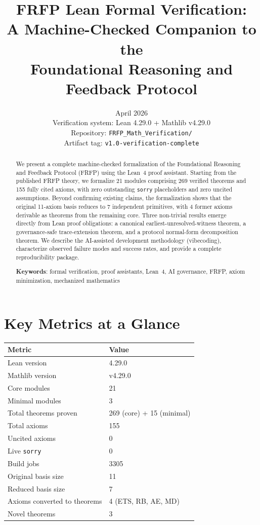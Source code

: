 \documentclass[12pt,a4paper]{article}
\title{%
  \textbf{FRFP Lean Formal Verification:}\\[0.4em]
  \large A Machine-Checked Companion to the\\
  Foundational Reasoning and Feedback Protocol
}
\author{}
\date{April 2026\\[0.5em]
  \small Verification system: Lean 4.29.0 + Mathlib v4.29.0\\
  Repository: \texttt{FRFP\_Math\_Verification/}\\
  Artifact tag: \texttt{v1.0-verification-complete}
}
\theoremstyle{plain}
\theoremstyle{definition}
\theoremstyle{remark}
\begin{document}

\maketitle
\thispagestyle{empty}

\begin{abstract}
We present a complete machine-checked formalization of the Foundational Reasoning
and Feedback Protocol (FRFP) using the Lean~4 proof assistant. Starting from the
published FRFP theory, we formalize 21 modules comprising 269 verified theorems
and 155 fully cited axioms, with zero outstanding \texttt{sorry} placeholders and
zero uncited assumptions. Beyond confirming existing claims, the formalization
shows that the original 11-axiom basis reduces to 7 independent primitives, with
4 former axioms derivable as theorems from the remaining core. Three non-trivial
results emerge directly from Lean proof obligations: a canonical
earliest-unresolved-witness theorem, a governance-safe trace-extension theorem,
and a protocol normal-form decomposition theorem. We describe the AI-assisted
development methodology (vibecoding), characterize observed failure modes and
success rates, and provide a complete reproducibility package.

\medskip
\noindent\textbf{Keywords}: formal verification, proof assistants, Lean~4, AI
governance, FRFP, axiom minimization, mechanized mathematics
\end{abstract}

\newpage
\tableofcontents
\newpage

\section*{Key Metrics at a Glance}

\begin{center}
\begin{tabular}{ll}
\toprule
Metric & Value \\
\midrule
Lean version & 4.29.0 \\
Mathlib version & v4.29.0 \\
Core modules & 21 \\
Minimal modules & 3 \\
Total theorems proven & 269 (core) + 15 (minimal) \\
Total axioms & 155 \\
Uncited axioms & 0 \\
Live \texttt{sorry} & 0 \\
Build jobs & 3305 \\
Original basis size & 11 \\
Reduced basis size & 7 \\
Axioms converted to theorems & 4 (ETS, RB, AE, MD) \\
Novel theorems & 3 \\
\bottomrule
\end{tabular}
\end{center}
\end{document}
